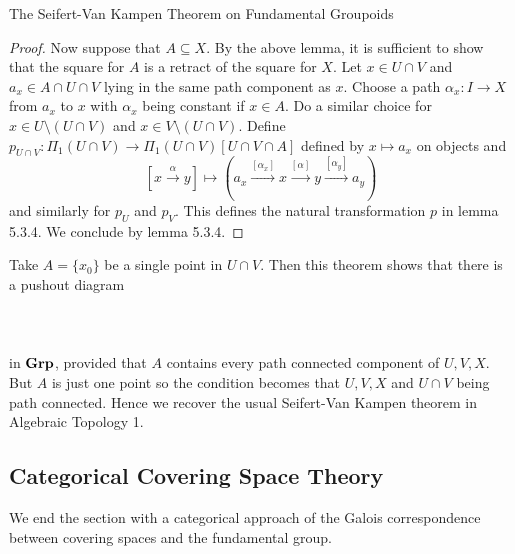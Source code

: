 \documentclass[a4paper]{article}
\begin{document}
\begin{thm}{The Seifert-Van Kampen Theorem on Fundamental Groupoids}{}
\begin{proof}
Now suppose that $A\subseteq X$. By the above lemma, it is sufficient to show that the square for $A$ is a retract of the square for $X$. Let $x\in U\cap V$ and $a_x\in A\cap U\cap V$ lying in the same path component as $x$. Choose a path $\alpha_x:I\to X$ from $a_x$ to $x$ with $\alpha_x$ being constant if $x\in A$. Do a similar choice for $x\in U\setminus(U\cap V)$ and $x\in V\setminus(U\cap V)$. Define $p_{U\cap V}:\Pi_1(U\cap V)\to\Pi_1(U\cap V)[U\cap V\cap A]$ defined by $x\mapsto a_x$ on objects and $$[x\overset{\alpha}{\to} y]\mapsto\left(a_x\overset{[\alpha_x]}{\to}x\overset{[\alpha]}{\to}y\overset{[\alpha_y]}{\to}a_y\right)$$ and similarly for $p_U$ and $p_V$. This defines the natural transformation $p$ in lemma 5.3.4. We conclude by lemma 5.3.4. 
\end{proof}
\end{thm}

Take $A=\{x_0\}$ be a single point in $U\cap V$. Then this theorem shows that there is a pushout diagram \\~\\
\\~\\
in $\bold{Grp}$, provided that $A$ contains every path connected component of $U,V,X$. But $A$ is just one point so the condition becomes that $U,V,X$ and $U\cap V$ being path connected. Hence we recover the usual Seifert-Van Kampen theorem in Algebraic Topology 1. 

\subsection{Categorical Covering Space Theory}
We end the section with a categorical approach of the Galois correspondence between covering spaces and the fundamental group. 
\end{document}
